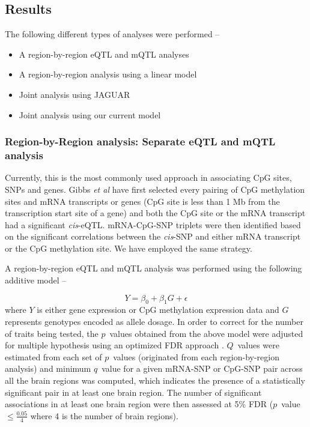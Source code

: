 \documentclass[hidelinks]{article}
\begin{document}
\subsection{Results}
The following different types of analyses were performed --

\begin{itemize}
\item A region-by-region eQTL and mQTL analyses 
\item A region-by-region analysis using a linear model
\item Joint analysis using JAGUAR
\item Joint analysis using our current model
\end{itemize}

\subsubsection{Region-by-Region analysis: Separate eQTL and mQTL analysis}

Currently, this is the most commonly used approach in associating CpG sites, SNPs and genes. Gibbs \emph{et al} have first selected every pairing of CpG methylation sites and mRNA transcripts or genes (CpG site is less than 1 Mb from the transcription start site of a gene) and both the CpG site or the mRNA transcript had a significant \emph{cis}-eQTL. mRNA-CpG-SNP triplets were then identified based on the significant correlations between the \emph{cis}-SNP and either mRNA transcript or the CpG methylation site. We have employed the same strategy. 

A region-by-region eQTL and mQTL analysis was performed using the following additive model --

\begin{equation*}
Y = \beta_0 + \beta_1 G + \epsilon
\end{equation*}
where $Y$ is either gene expression or CpG methylation expression data and $G$ represents genotypes encoded as allele dosage. In order to correct for the number of traits being tested, the $p$~values obtained from the above model were adjusted for multiple hypothesis using an optimized FDR approach \cite{qvalue}. $Q$~values were estimated from each set of $p$~values (originated from each region-by-region analysis) and minimum $q$~value for a given mRNA-SNP or CpG-SNP pair across all the brain regions was computed, which indicates the presence of a statistically significant pair in at least one brain region. The number of significant associations in at least one brain region were then assessed at 5\% FDR ($p$~value $\leq \frac{0.05}{4}$ where 4 is the number of brain regions). 
\end{document}
